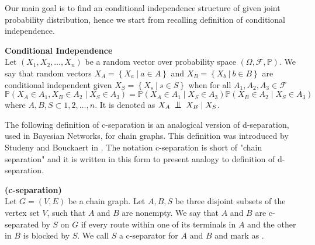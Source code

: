 
%
Our main goal is to find an conditional independence structure of given joint probability distribution, hence we start from recalling definition of conditional independence.

\begin{defi} \label{condInd} {\textbf{Conditional Independence}} \\
	Let $(X_1, X_2, \dots, X_n)$ be a random vector over probability space $(\Omega, \mathcal{F}, \mathbb{P})$.
	We say that random vectors $X_A = \left\{ X_a  \ | \ a \in A \right\}$ and 
	$X_B = \left\{ X_b  \ | \ b \in B \right\}$
	are conditional independent given $X_S = \left\{ X_s  \ | \ s \in S \right\}$ when 
	for all $A_1, A_2, A_3 \in \mathcal{F}$
	\begin{equation} 
		\mathbb{P}(X_A \in A_1, X_B \in A_2 \mid X_S \in A_3) = \mathbb{P}(X_A \in A_1 \mid X_S \in A_3) 													\mathbb{P}(X_B \in A_2 \mid X_S \in A_3)
	\end{equation}
	where $A, B, S \subset {1, 2, \dots, n}$. It is denoted as $X_A \bigCI X_B \mid X_S$.
\end{defi}
The following definition of c-separation is an analogical version of d-separation, used in Bayesian Networks, for chain graphs. This definition was introduced by Studeny and Bouckaert in \cite{OCG}. The notation c-separation is short of "chain separation" and it is written in this form to present analogy to definition of d-separation.


\begin{defi} \label{cSepDef} {\textbf{(c-separation)}} \\
	Let $G = (V, E)$ be a chain graph. Let $A, B, S$ be three disjoint subsets of the vertex set $V$, such that
	$A$ and $B$ are nonempty. We say that $A$ and $B$ are c-separated by $S$ on $G$ if every route within one of 
	its terminals in $A$ and the other in $B$ is blocked by $S$. 
	We call $S$ a c-separator for $A$ and $B$ and mark as .
\end{defi}


